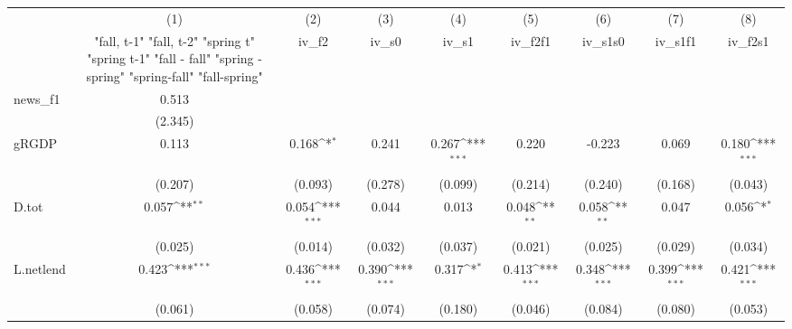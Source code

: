 {
\def\sym#1{\ifmmode^{#1}\else\(^{#1}\)\fi}
\begin{tabular}{l*{8}{c}}
\toprule
            &\multicolumn{1}{c}{(1)}&\multicolumn{1}{c}{(2)}&\multicolumn{1}{c}{(3)}&\multicolumn{1}{c}{(4)}&\multicolumn{1}{c}{(5)}&\multicolumn{1}{c}{(6)}&\multicolumn{1}{c}{(7)}&\multicolumn{1}{c}{(8)}\\
            &\multicolumn{1}{c}{  "fall, t-1" "fall, t-2" "spring t" "spring t-1"  "fall - fall" "spring - spring" "spring-fall" "fall-spring" }&\multicolumn{1}{c}{iv\_f2}&\multicolumn{1}{c}{iv\_s0}&\multicolumn{1}{c}{iv\_s1}&\multicolumn{1}{c}{iv\_f2f1}&\multicolumn{1}{c}{iv\_s1s0}&\multicolumn{1}{c}{iv\_s1f1}&\multicolumn{1}{c}{iv\_f2s1}\\
\midrule
news\_f1     &       0.513         &                     &                     &                     &                     &                     &                     &                     \\
            &     (2.345)         &                     &                     &                     &                     &                     &                     &                     \\
\addlinespace
gRGDP       &       0.113         &       0.168\sym{*}  &       0.241         &       0.267\sym{***}&       0.220         &      -0.223         &       0.069         &       0.180\sym{***}\\
            &     (0.207)         &     (0.093)         &     (0.278)         &     (0.099)         &     (0.214)         &     (0.240)         &     (0.168)         &     (0.043)         \\
\addlinespace
D.tot       &       0.057\sym{**} &       0.054\sym{***}&       0.044         &       0.013         &       0.048\sym{**} &       0.058\sym{**} &       0.047         &       0.056\sym{*}  \\
            &     (0.025)         &     (0.014)         &     (0.032)         &     (0.037)         &     (0.021)         &     (0.025)         &     (0.029)         &     (0.034)         \\
\addlinespace
L.netlend   &       0.423\sym{***}&       0.436\sym{***}&       0.390\sym{***}&       0.317\sym{*}  &       0.413\sym{***}&       0.348\sym{***}&       0.399\sym{***}&       0.421\sym{***}\\
            &     (0.061)         &     (0.058)         &     (0.074)         &     (0.180)         &     (0.046)         &     (0.084)         &     (0.080)         &     (0.053)         \\

\end{tabular}}
